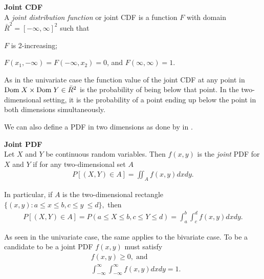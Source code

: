 \begin{definition}\label{def:JointCDF} \textbf{Joint CDF} \\
    A \emph{joint distribution function} or joint \gls{CDF} is a function $F$ with domain $\bar{R}^2 = [-\infty, \infty]^2$ such that 
    \begin{compactenum}
        \item $F$ is 2-increasing; 
        \item $F(x_1,-\infty)= F(-\infty, x_2) = 0$, and $F(\infty,\infty)=1$.
    \end{compactenum}
\end{definition}

As in the univariate case the function value of the joint \gls{CDF} at any point in $\mathrm{Dom \;} X\times \mathrm{Dom \;} Y \in\bar{R}^2$  is the probability of being below that point. In the two-dimensional setting, it is the probability of a point ending up below the point in both dimensions simultaneously. 

We can also define a \gls{PDF} in two dimensions as done by \citet[p.~235]{DevoreBerk2012} in .

\begin{definition}\label{def:JointPDF} \textbf{Joint PDF} \\
    Let $X$ and $Y$ be continuous random variables. Then $f(x, y)$ is the \emph{joint} \gls{PDF} for $X$ and $Y$ if for any two-dimensional set $A$ 
    \begin{align*}
        P[(X,Y) \in A] =  \iint_A f(x,y)dxdy.
    \end{align*}
    
    In particular, if $A$ is the two-dimensional rectangle $\{(x,y) : a\leq x \leq b, c\leq y \ \leq d\}, $ then
    \begin{align*}
        P[(X,Y) \in A] = P(a\leq X \leq b, c \leq Y \leq d) =\int_a^b\!\!\!\int_c^d f(x,y)dxdy.
    \end{align*}
\end{definition}

\begin{remark}
    As seen in the univariate case, the same applies to the bivariate case. To be a candidate to be a joint \gls{PDF} $f(x,y)$ must satisfy 
    \begin{align*}
        &f(x,y) \geq 0, \;\mathrm{and} \\
        &\int_{-\infty}^{\infty}\!\int_{-\infty}^{\infty}f(x,y)dxdy=1.
    \end{align*}    
\end{remark}


